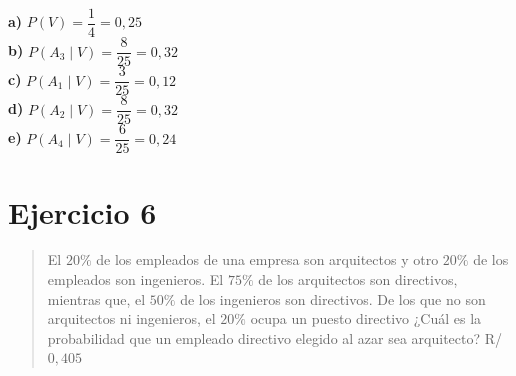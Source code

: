 \documentclass[11pt]{article}
\begin{document}
\begin{sol}
\begin{resp}
\textbf{a)} $P(V)=\dfrac14=0,25$\\
\textbf{b)} $P(A_3\mid V)=\dfrac{8}{25}=0,32$\\
\textbf{c)} $P(A_1\mid V)=\dfrac{3}{25}=0,12$\\
\textbf{d)} $P(A_2\mid V)=\dfrac{8}{25}=0,32$\\
\textbf{e)} $P(A_4\mid V)=\dfrac{6}{25}=0,24$
\end{resp}

\end{sol}

\newpage
\section*{Ejercicio 6}

\begin{quote}
El $20\%$ de los empleados de una empresa son arquitectos y otro $20\%$ de los empleados son ingenieros. El $75\%$ de los arquitectos son directivos, mientras que, el $50\%$ de los ingenieros son directivos. De los que no son arquitectos ni ingenieros, el $20\%$ ocupa un puesto directivo ¿Cuál es la probabilidad que un empleado directivo elegido al azar sea arquitecto? \hfill R/ $0,405$
\end{quote}
\end{document}
